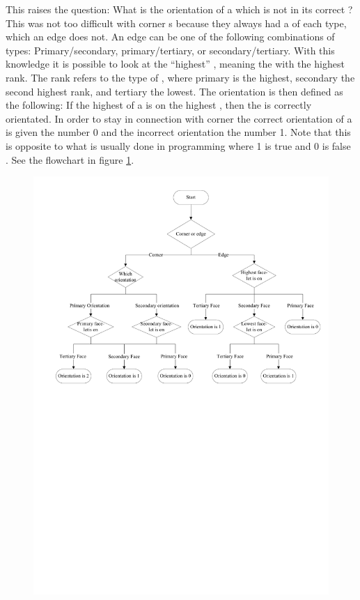 This raises the question: What is the orientation of a \cubie{} which is not in its correct \cubicle{}?
This was not too difficult with corner \cubie{}s because they always had a \facelet{} of each type, which an edge \cubie{} does not. An edge \cubie{} can be one of the following combinations of \facelet{} types: Primary/secondary, primary/tertiary, or secondary/tertiary. With this knowledge it is possible to look at the ``highest'' \facelet{}, meaning the \facelet{} with the highest rank.
The rank refers to the type of \facelet{}, where primary is the highest, secondary the second highest rank, and tertiary the lowest.
The orientation is then defined as the following: If the highest \facelet{} of a \cubie{} is on the highest \face{}, then the \cubie{} is correctly orientated.
In order to stay in connection with corner \cubie{} the correct orientation of a \cubie{} is given the number 0 and the incorrect orientation the number 1.
Note that this is opposite to what is usually done in programming where 1 is true and 0 is false \cite{boolean2}.
See the flowchart in figure \ref{fig:orientationFlow}.
\begin{figure}[hbp]
	\centering
		\includegraphics[width = \textwidth, trim = 10mm 150mm 0mm 10mm, clip]{input/pics/orientationFlow}
	\caption{}
	\label{fig:orientationFlow}
\end{figure}